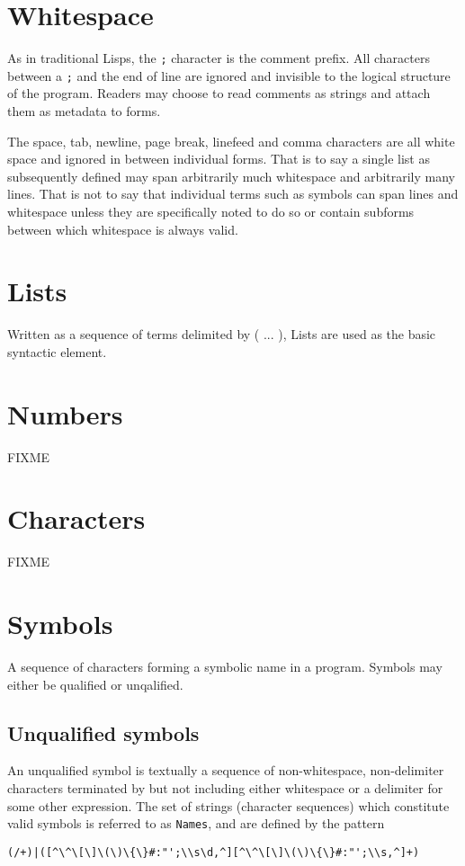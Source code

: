 \documentclass{report}
\begin{document}
\section{Whitespace}


As in traditional Lisps, the \verb|;| character is the comment prefix. All
characters between a \verb|;| and the end of line are ignored and invisible to
the logical structure of the program. Readers may choose to read comments as
strings and attach them as metadata to forms.

The space, tab, newline, page break, linefeed and comma characters are all white
space and ignored in between individual forms. That is to say a single list as
subsequently defined may span arbitrarily much whitespace and arbitrarily many
lines. That is not to say that individual terms such as symbols can span lines
and whitespace unless they are specifically noted to do so or contain subforms
between which whitespace is always valid.

\section{Lists}


Written as a sequence of terms delimited by ( ... ), Lists are used as the basic
syntactic element.

\section{Numbers}


FIXME

\section{Characters}


FIXME

\section{Symbols}


A sequence of characters forming a symbolic name in a program. Symbols may
either be qualified or unqalified.

\subsection{Unqualified symbols}
An unqualified symbol is textually a sequence of non-whitespace, non-delimiter
characters terminated by but not including either whitespace or a delimiter for
some other expression. The set of strings (character sequences) which constitute
valid symbols is referred to as \verb|Names|, and are defined by the pattern
\begin{verbatim}
(/+)|([^\^\[\]\(\)\{\}#:"';\\s\d,^][^\^\[\]\(\)\{\}#:"';\\s,^]+)
\end{verbatim}
\end{document}
